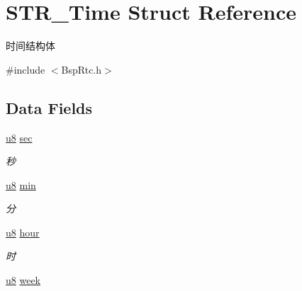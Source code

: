 \hypertarget{struct_s_t_r___time}{\section{\-S\-T\-R\-\_\-\-Time \-Struct \-Reference}
\label{struct_s_t_r___time}
}


时间结构体  




{\ttfamily \#include $<$\-Bsp\-Rtc.\-h$>$}

\subsection*{\-Data \-Fields}
\begin{DoxyCompactItemize}
\item 
\hypertarget{struct_s_t_r___time_a2ed8da238547b587d3e2589b7b8482e5}{\hyperlink{group___b_s_p_gaed742c436da53c1080638ce6ef7d13de}{u8} \hyperlink{struct_s_t_r___time_a2ed8da238547b587d3e2589b7b8482e5}{sec}}\label{struct_s_t_r___time_a2ed8da238547b587d3e2589b7b8482e5}

\begin{DoxyCompactList}\small\item\em 秒 \end{DoxyCompactList}\item 
\hypertarget{struct_s_t_r___time_ab7e24e653a226218133723786f7bf62b}{\hyperlink{group___b_s_p_gaed742c436da53c1080638ce6ef7d13de}{u8} \hyperlink{struct_s_t_r___time_ab7e24e653a226218133723786f7bf62b}{min}}\label{struct_s_t_r___time_ab7e24e653a226218133723786f7bf62b}

\begin{DoxyCompactList}\small\item\em 分 \end{DoxyCompactList}\item 
\hypertarget{struct_s_t_r___time_aee425ac71759c167362d22f272d89804}{\hyperlink{group___b_s_p_gaed742c436da53c1080638ce6ef7d13de}{u8} \hyperlink{struct_s_t_r___time_aee425ac71759c167362d22f272d89804}{hour}}\label{struct_s_t_r___time_aee425ac71759c167362d22f272d89804}

\begin{DoxyCompactList}\small\item\em 时 \end{DoxyCompactList}\item 
\hypertarget{struct_s_t_r___time_abdb1fa8a039d262028d66332a8493389}{\hyperlink{group___b_s_p_gaed742c436da53c1080638ce6ef7d13de}{u8} \hyperlink{struct_s_t_r___time_abdb1fa8a039d262028d66332a8493389}{week}}\label{struct_s_t_r___time_abdb1fa8a039d262028d66332a8493389}


\end{DoxyCompactItemize}
